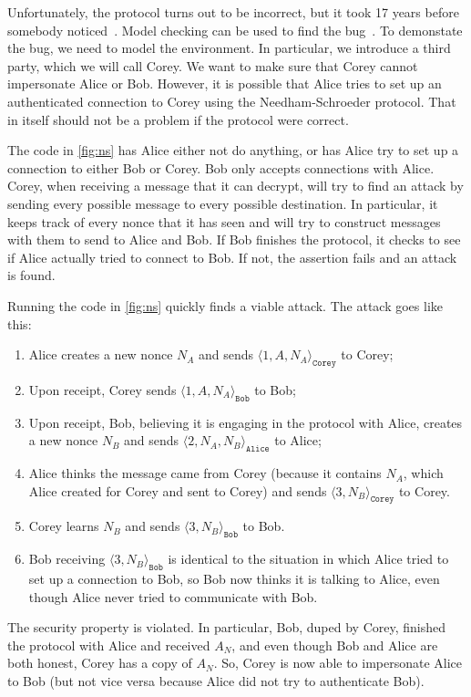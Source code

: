 \documentclass{report}
\begin{document}
Unfortunately, the protocol turns out to be incorrect, but it took 17 years before
somebody noticed~\cite{Lowe95}.  Model checking can be used to find the bug~\cite{Lowe96}.
To demonstate the bug, we need to model the environment.
In particular, we introduce a third party, which we will call Corey.
We want to make sure that Corey cannot impersonate Alice or Bob.
However, it is possible that Alice tries to set up an authenticated connection to Corey
using the Needham-Schroeder protocol.  That in itself should not be a problem if the
protocol were correct.

The code in \autoref{fig:ns} has Alice either not do anything, or has Alice try to set
up a connection to either Bob
or Corey.  Bob only accepts connections with Alice.  Corey, when receiving a message
that it can decrypt, will try to find an attack by sending every possible message to
every possible destination.  In particular, it keeps track of every nonce that it has
seen and will try to construct messages with them to send to Alice and Bob.
If Bob finishes the protocol, it checks to see if Alice actually tried to connect
to Bob.  If not, the assertion fails and an attack is found.

Running the code in \autoref{fig:ns} quickly finds a viable attack.  The attack goes
like this:

\begin{enumerate}
\item Alice creates a new nonce $N_A$ and sends $\langle 1, A, N_A \rangle_\mathtt{Corey}$
to Corey;
\item Upon receipt, Corey sends $\langle 1, A, N_A \rangle_\mathtt{Bob}$ to Bob;
\item Upon receipt, Bob, believing it is engaging in the protocol with Alice,
creates a new nonce $N_B$ and sends
$\langle 2, N_A, N_B \rangle_\mathtt{Alice}$ to Alice;
\item Alice thinks the message came from Corey (because it contains $N_A$, which
Alice created for Corey and sent to Corey) and
sends $\langle 3, N_B \rangle_\mathtt{Corey}$ to Corey.
\item Corey learns $N_B$ and sends $\langle 3, N_B \rangle_\mathtt{Bob}$ to Bob.
\item Bob receiving $\langle 3, N_B \rangle_\mathtt{Bob}$ is identical to the
situation in which Alice tried to set up a connection to Bob,
so Bob now thinks it is talking to Alice, even though Alice never tried to
communicate with Bob.
\end{enumerate}
The security property is violated.  In particular, Bob, duped by Corey, finished
the protocol with Alice and received $A_N$, and even though Bob and Alice
are both honest, Corey has a copy of $A_N$.  So, Corey is now able to impersonate
Alice to Bob (but not vice versa because Alice did not try to authenticate Bob).
\end{document}
